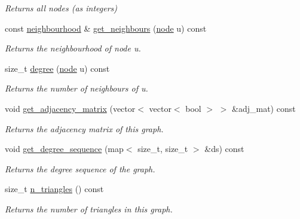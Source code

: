 \begin{DoxyCompactItemize}
\begin{DoxyCompactList}\small\item\em Returns all nodes (as integers) \end{DoxyCompactList}\item 
const \hyperlink{namespacelgraph_1_1utils_a0f2ef47028a466d26841709e705390ac}{neighbourhood} \& \hyperlink{classlgraph_1_1utils_1_1xxgraph_a2c5332c4663c2d52828893f095a68202}{get\+\_\+neighbours} (\hyperlink{namespacelgraph_1_1utils_a7bd66ede3805ef121bc2835bd48de0cf}{node} u) const 
\begin{DoxyCompactList}\small\item\em Returns the neighbourhood of node u. \end{DoxyCompactList}\item 
size\+\_\+t \hyperlink{classlgraph_1_1utils_1_1xxgraph_af588aa4c68004a31aa143024cdb6dcc9}{degree} (\hyperlink{namespacelgraph_1_1utils_a7bd66ede3805ef121bc2835bd48de0cf}{node} u) const 
\begin{DoxyCompactList}\small\item\em Returns the number of neighbours of u. \end{DoxyCompactList}\item 
void \hyperlink{classlgraph_1_1utils_1_1xxgraph_a401454762f6b4b69f13ab0a10729c457}{get\+\_\+adjacency\+\_\+matrix} (vector$<$ vector$<$ bool $>$ $>$ \&adj\+\_\+mat) const \hypertarget{classlgraph_1_1utils_1_1xxgraph_a401454762f6b4b69f13ab0a10729c457}{}\label{classlgraph_1_1utils_1_1xxgraph_a401454762f6b4b69f13ab0a10729c457}

\begin{DoxyCompactList}\small\item\em Returns the adjacency matrix of this graph. \end{DoxyCompactList}\item 
void \hyperlink{classlgraph_1_1utils_1_1xxgraph_aff73f5ac4cd2732caa0c528eb1c1833c}{get\+\_\+degree\+\_\+sequence} (map$<$ size\+\_\+t, size\+\_\+t $>$ \&ds) const 
\begin{DoxyCompactList}\small\item\em Returns the degree sequence of the graph. \end{DoxyCompactList}\item 
size\+\_\+t \hyperlink{classlgraph_1_1utils_1_1xxgraph_ad4f25a8b29c6f26bc1567cb9c5a564ba}{n\+\_\+triangles} () const 
\begin{DoxyCompactList}\small\item\em Returns the number of triangles in this graph. \end{DoxyCompactList}\end{DoxyCompactItemize}
